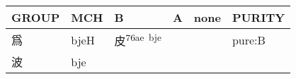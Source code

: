 \documentclass[14pt,a4paper]{scrartcl}
\begin{document}
\begin{longtable}[c]{@{}llllll@{}}
\toprule
\begin{minipage}[b]{0.14\columnwidth}\raggedright\strut
GROUP
\strut\end{minipage} &
\begin{minipage}[b]{0.14\columnwidth}\raggedright\strut
MCH
\strut\end{minipage} &
\begin{minipage}[b]{0.14\columnwidth}\raggedright\strut
B
\strut\end{minipage} &
\begin{minipage}[b]{0.14\columnwidth}\raggedright\strut
A
\strut\end{minipage} &
\begin{minipage}[b]{0.14\columnwidth}\raggedright\strut
none
\strut\end{minipage} &
\begin{minipage}[b]{0.14\columnwidth}\raggedright\strut
PURITY
\strut\end{minipage}\tabularnewline
\midrule
\endhead
\begin{minipage}[t]{0.14\columnwidth}\raggedright\strut
爲
\strut\end{minipage} &
\begin{minipage}[t]{0.14\columnwidth}\raggedright\strut
bjeH
\strut\end{minipage} &
\begin{minipage}[t]{0.14\columnwidth}\raggedright\strut
皮\textsuperscript{76ae~bje}
\strut\end{minipage} &
\begin{minipage}[t]{0.14\columnwidth}\raggedright\strut
\strut\end{minipage} &
\begin{minipage}[t]{0.14\columnwidth}\raggedright\strut
\strut\end{minipage} &
\begin{minipage}[t]{0.14\columnwidth}\raggedright\strut
pure:B
\strut\end{minipage}\tabularnewline
\begin{minipage}[t]{0.14\columnwidth}\raggedright\strut
波
\strut\end{minipage} &
\begin{minipage}[t]{0.14\columnwidth}\raggedright\strut
bje
\strut\end{minipage} &
\begin{minipage}[t]{0.14\columnwidth}\raggedright\strut
\strut\end{minipage} &
\begin{minipage}[t]{0.14\columnwidth}\raggedright\strut

\end{minipage}
\end{longtable}
\end{document}
